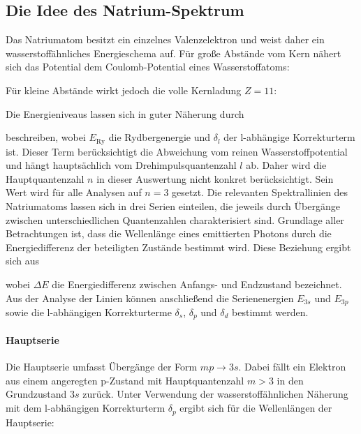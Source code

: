 \subsection[Das Na-Spektrum]{Die Idee des Natrium-Spektrum}

Das Natriumatom besitzt ein einzelnes Valenzelektron und weist daher ein wasserstoffähnliches Energieschema auf. Für große Abstände vom Kern nähert sich das Potential dem Coulomb-Potential eines Wasserstoffatoms:


Für kleine Abstände wirkt jedoch die volle Kernladung $Z=11$:



Die Energieniveaus lassen sich in guter Näherung durch


beschreiben, wobei $E_\mathrm{Ry}$ die Rydbergenergie und $\delta_l$ der l-abhängige Korrekturterm ist. Dieser Term berücksichtigt die Abweichung vom reinen Wasserstoffpotential und hängt hauptsächlich vom Drehimpulsquantenzahl $l$ ab. Daher wird die Hauptquantenzahl $n$ in dieser Auswertung nicht konkret berücksichtigt. Sein Wert wird für alle Analysen auf $n=3$ gesetzt.
Die relevanten Spektrallinien des Natriumatoms lassen sich in drei Serien einteilen, die jeweils durch Übergänge zwischen unterschiedlichen Quantenzahlen charakterisiert sind. Grundlage aller Betrachtungen ist, dass die Wellenlänge eines emittierten Photons durch die Energiedifferenz der beteiligten Zustände bestimmt wird. Diese Beziehung ergibt sich aus


wobei $\Delta E$ die Energiedifferenz zwischen Anfangs- und Endzustand bezeichnet. Aus der Analyse der Linien können anschließend die Serienenergien $E_{3s}$ und $E_{3p}$ sowie die l-abhängigen Korrekturterme $\delta_s$, $\delta_p$ und $\delta_d$ bestimmt werden.

\paragraph{Hauptserie}
Die Hauptserie umfasst Übergänge der Form $m p \rightarrow 3s$. Dabei fällt ein Elektron aus einem angeregten p-Zustand mit Hauptquantenzahl $m > 3$ in den Grundzustand $3s$ zurück. Unter Verwendung der wasserstoffähnlichen Näherung mit dem l-abhängigen Korrekturterm $\delta_p$ ergibt sich für die Wellenlängen der Hauptserie:

